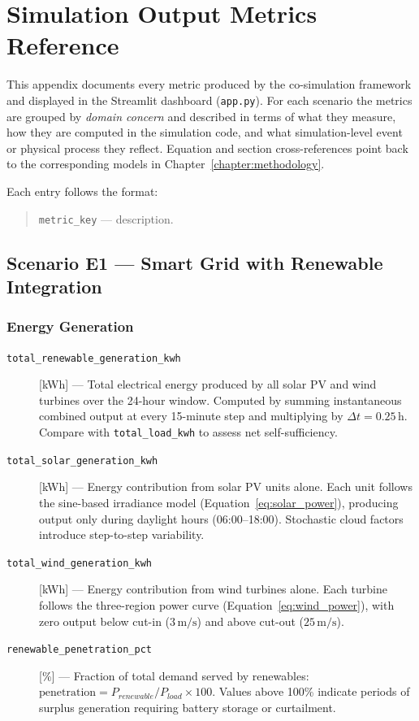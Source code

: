 \chapter{Simulation Output Metrics Reference}
\label{appendix:metrics}

This appendix documents every metric produced by the co-simulation framework
and displayed in the Streamlit dashboard (\texttt{app.py}).  For each scenario
the metrics are grouped by \emph{domain concern} and described in terms of
what they measure, how they are computed in the simulation code, and what
simulation-level event or physical process they reflect.  Equation and section
cross-references point back to the corresponding models in
Chapter~\ref{chapter:methodology}.

Each entry follows the format:
\begin{quote}
\texttt{metric\_key}  --- description.
\end{quote}

\section{Scenario E1 --- Smart Grid with Renewable Integration}
\label{sec:metrics-e1}

\subsection*{Energy Generation}

\begin{description}

\item[\texttt{total\_renewable\_generation\_kwh}] [kWh] ---
  Total electrical energy produced by all solar PV and wind turbines over the
  24-hour window.  Computed by summing instantaneous combined output at every
  15-minute step and multiplying by $\Delta t = 0.25\,\text{h}$.  Compare
  with \texttt{total\_load\_kwh} to assess net self-sufficiency.

\item[\texttt{total\_solar\_generation\_kwh}] [kWh] ---
  Energy contribution from solar PV units alone.  Each unit follows the
  sine-based irradiance model (Equation~\ref{eq:solar_power}), producing
  output only during daylight hours (06:00--18:00).  Stochastic cloud factors
  introduce step-to-step variability.

\item[\texttt{total\_wind\_generation\_kwh}] [kWh] ---
  Energy contribution from wind turbines alone.  Each turbine follows the
  three-region power curve (Equation~\ref{eq:wind_power}), with zero output
  below cut-in ($3\,\text{m/s}$) and above cut-out ($25\,\text{m/s}$).

\item[\texttt{renewable\_penetration\_pct}] [\%] ---
  Fraction of total demand served by renewables:
  $\text{penetration} = P_{renewable} / P_{load} \times 100$.  Values above
  100\% indicate periods of surplus generation requiring battery storage or
  curtailment.

\end{description}


